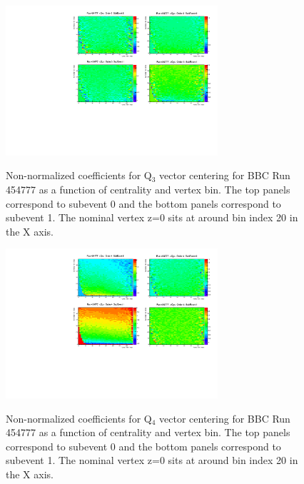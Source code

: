 \documentclass{article}
\begin{document}
\begin{figure}
\centering
\includegraphics[width=0.7\textwidth]{fig_eventplane/QC_454777_ORD2.pdf}
\label{fig.bbc.qc2}
\caption{Non-normalized coefficients for Q$_3$ vector centering for BBC Run 454777 as a function of centrality and vertex bin. The top panels correspond to subevent 0 and the bottom panels correspond to subevent 1. The nominal vertex z=0 sits at around bin index 20 in the X axis.}
\end{figure}
\begin{figure}
\centering
\includegraphics[width=0.7\textwidth]{fig_eventplane/QC_454777_ORD3.pdf}
\label{fig.bbc.qc3}
\caption{Non-normalized coefficients for Q$_4$ vector centering for BBC Run 454777 as a function of centrality and vertex bin. The top panels correspond to subevent 0 and the bottom panels correspond to subevent 1. The nominal vertex z=0 sits at around bin index 20 in the X axis.}
\end{figure}
\end{document}
